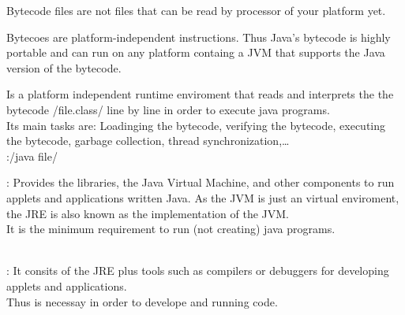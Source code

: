 \begin{notebox}[Notes]\nospacing
  \begin{itemizenosep}
      \item Bytecode files are not files that can be read by processor of your platform yet.
      \item Bytecoes are platform-independent instructions. Thus Java's bytecode is highly portable and can run on any platform
    containg a JVM that supports the Java version of the bytecode.
  \end{itemizenosep}
\end{notebox}
\begin{defnbox}\nospacing
  \begin{defn}
    Is a platform independent runtime enviroment that reads and interprets the the bytecode \javainline/file.class/ line by line
    in order to execute java programs.\\
    Its main tasks are: Loadinging the bytecode, verifying the bytecode, executing the bytecode, garbage collection,
    thread synchronization,\ldots\\
    :\hfil \javainline/java file/
  \end{defn}
\end{defnbox}
\begin{defnbox}\nospacing
  \begin{defn}
    :
    Provides the libraries, the Java Virtual Machine, and other components to run applets and applications
    written Java. As the JVM is just an virtual enviroment, the JRE is also known as the implementation of the JVM.\\
    It is the minimum requirement to run (not creating) java programs.
  \end{defn}
\end{defnbox}
\begin{defnbox}\nospacing
  \begin{defn}\leavevmode\\
    :
    It consits of the JRE plus tools such as compilers or debuggers for developing applets and applications.\\
    Thus is necessay in order to develope and running code.
  \end{defn}
\end{defnbox}
\begin{sectionbox}\nospacing
  \begin{figure}[H]	
    \centering{
      \vspace{-1em}
      \def\svgwidth{190pt}
      \resizebox{0.8\linewidth}{!}{}
    }
  \end{figure}
\end{sectionbox}
